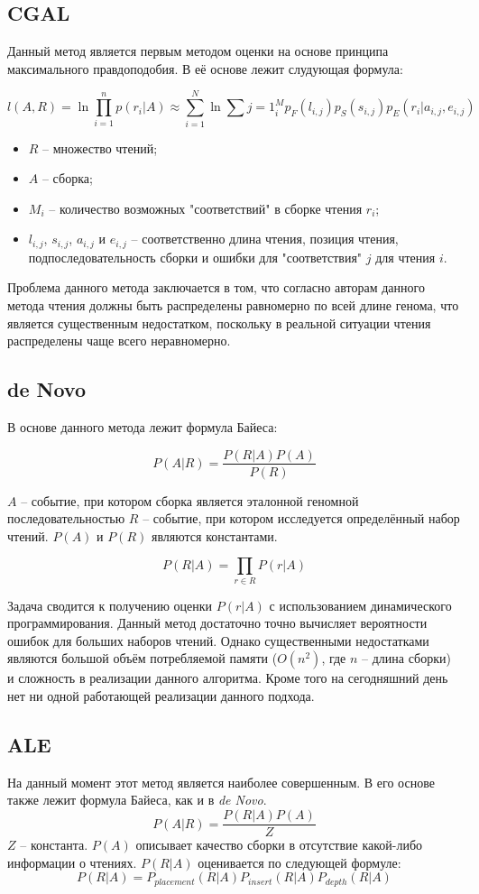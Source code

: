 \subsection{CGAL}
Данный метод является первым методом оценки на основе принципа максимального правдоподобия. В её основе лежит слудующая формула:

$$l(A,R)=\ln \prod_{i=1}^n p(r_i|A)\approx \sum_{i=1}^N \ln\sum{j=1}^M_i p_F(l_{i,j})p_S(s_{i,j})p_E(r_i|a_{i,j}, e_{i,j})$$

\begin{itemize}
\item $R$ -- множество чтений;
\item $A$ -- сборка;
\item $M_i$ -- количество возможных "соответствий" в сборке чтения $r_i$;
\item $l_{i,j}$, $s_{i,j}$, $a_{i,j}$ и $e_{i,j}$ -- соответственно длина чтения, позиция чтения, подпоследовательность сборки и ошибки для "соответствия" $j$ для чтения $i$.
\end{itemize}

Проблема данного метода заключается в том, что согласно авторам данного метода чтения должны быть распределены равномерно по всей длине генома, что является существенным недостатком, поскольку в реальной ситуации чтения распределены чаще всего неравномерно.

\subsection{de Novo}
В основе данного метода лежит формула Байеса:

$$P(A|R)=\frac{P(R|A)P(A)}{P(R)}$$

$A$ -- событие, при котором сборка является эталонной геномной последовательностью $R$ -- событие, при котором исследуется определённый набор чтений. $P(A)$ и $P(R)$ являются константами.

$$P(R|A)=\prod_{r\in R}P(r|A)$$


Задача сводится к получению оценки $P(r|A)$ с использованием  динамического программирования. Данный метод достаточно точно вычисляет вероятности ошибок для больших наборов чтений. Однако существенными недостатками являются большой объём потребляемой памяти ($O(n^2)$, где $n$ -- длина сборки) и сложность в реализации данного алгоритма. Кроме того на сегодняшний день нет ни одной работающей реализации данного подхода.


\subsection{ALE}
На данный момент этот метод является наиболее совершенным. В его основе также лежит формула Байеса, как и в \textit{de Novo}.
$$P(A|R)=\frac{P(R|A)P(A)}{Z}$$
$Z$ – константа.
$P(A)$ описывает качество сборки в отсутствие какой-либо информации о чтениях.
$P(R|A)$ оценивается по следующей формуле:
$$P(R|A)=P_{placement}(R|A)P_{insert}(R|A)P_{depth}(R|A)$$

